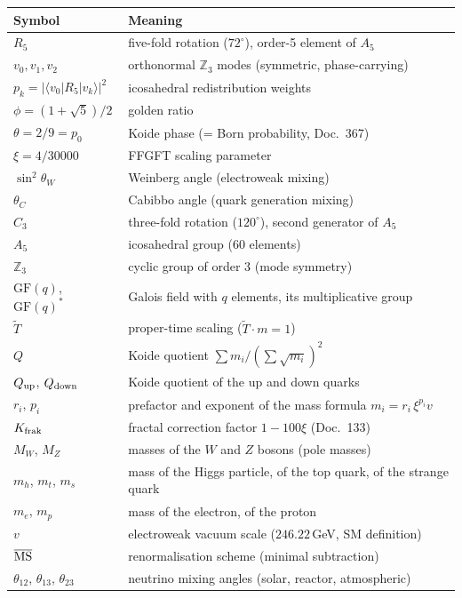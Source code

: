 \medskip
\begin{tabular}{@{}lp{9cm}@{}}
\toprule
\textbf{Symbol} & \textbf{Meaning} \\
\midrule
$R_5$ & five-fold rotation ($72^\circ$), order-5 element of $A_5$ \\
$v_0,v_1,v_2$ & orthonormal $\mathbb Z_3$ modes (symmetric, phase-carrying) \\
$p_k = |\langle v_0|R_5|v_k\rangle|^2$ & icosahedral redistribution weights \\
$\phi = (1+\sqrt5)/2$ & golden ratio \\
$\theta = 2/9 = p_0$ & Koide phase (= Born probability, Doc.~367) \\
$\xi = 4/30000$ & FFGFT scaling parameter \\
$\sin^2\theta_W$ & Weinberg angle (electroweak mixing) \\
$\theta_C$ & Cabibbo angle (quark generation mixing) \\
\midrule
$C_3$ & three-fold rotation ($120^\circ$), second generator of $A_5$ \\
$A_5$ & icosahedral group (60 elements) \\
$\mathbb Z_3$ & cyclic group of order 3 (mode symmetry) \\
$\mathrm{GF}(q)$, $\mathrm{GF}(q)^*$ & Galois field with $q$ elements, its multiplicative group \\
$\tilde T$ & proper-time scaling ($\tilde T\cdot m = 1$) \\
$Q$ & Koide quotient $\sum m_i/(\sum\sqrt{m_i})^2$ \\
$Q_{\rm up}$, $Q_{\rm down}$ & Koide quotient of the up and down quarks \\
$r_i$, $p_i$ & prefactor and exponent of the mass formula $m_i = r_i\,\xi^{p_i}v$ \\
$K_{\rm frak}$ & fractal correction factor $1-100\xi$ (Doc.~133) \\
\midrule
$M_W$, $M_Z$ & masses of the $W$ and $Z$ bosons (pole masses) \\
$m_h$, $m_t$, $m_s$ & mass of the Higgs particle, of the top quark, of the strange quark \\
$m_e$, $m_p$ & mass of the electron, of the proton \\
$v$ & electroweak vacuum scale ($246.22$\,GeV, SM definition) \\
$\overline{\rm MS}$ & renormalisation scheme (minimal subtraction) \\
$\theta_{12}$, $\theta_{13}$, $\theta_{23}$ & neutrino mixing angles (solar, reactor, atmospheric) \\

\end{tabular}
